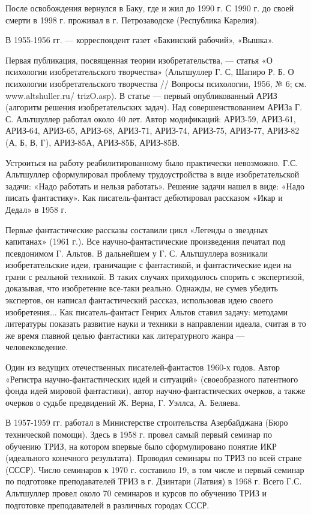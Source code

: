 После освобождения вернулся в Баку, где и  жил до 1990 г. С 1990 г. до
своей  смерти  в  1998  г. проживал  в  г.  Петрозаводске  (Республика
Карелия).

В 1955-1956 гг. — корреспондент газет «Бакинский рабочий», «Вышка».

Первая публикация,  посвященная теории  изобретательства, —  статья «О
психологии изобретательского  творчества» (Альтшуллер Г. С,  Шапиро Р.
Б. О  психологии изобретательского  творчества //  Вопросы психологии,
1956,  №  6; см.  www.altshuller.ru/  trizO.asp).  В статье  —  первый
опубликованный  АРИЗ (алгоритм  решения  изобретательских задач).  Над
совершенствованием АРИЗа Г. С. Альтшуллер  работал около 40 лет. Автор
модификаций:  АРИЗ-59, АРИЗ-61,  АРИЗ-64,  АРИЗ-65, АРИЗ-68,  АРИЗ-71,
АРИЗ-74, АРИЗ-75, АРИЗ-77,  АРИЗ-82 (А, Б, В,  Г), АРИЗ-85А, АРИЗ-85Б,
АРИЗ-85В.

Устроиться на  работу реабилитированному было  практически невозможно.
Г.С.   Альтшуллер  сформулировал   проблему  трудоустройства   в  виде
изобретательской задачи:  «Надо работать  и нельзя  работать». Решение
задачи нашел  в виде:  «Надо писать фантастику».  Как писатель-фантаст
дебютировал рассказом «Икар и Дедал» в 1958 г.

Первые  фантастические рассказы  составили  цикл  «Легенды о  звездных
капитанах» (1961  г.). Все научно-фантастические  произведения печатал
под псевдонимом Г. Альтов. В  дальнейшем у Г. С. Альтшуллера возникали
изобретательские идеи, граничащие с фантастикой, и фантастические идеи
на грани  с реальной техникой.  В таких случаях приходилось  спорить с
экспертизой,  доказывая, что  изобретение  все-таки реально.  Однажды,
не  сумев  убедить  экспертов,   он  написал  фантастический  рассказ,
использовав  идею своего  изобретения...  Как писатель-фантаст  Генрих
Альтов ставил  задачу: методами  литературы показать развитие  науки и
техники  в направлении  идеала, считая  в  то же  время главной  целью
фантастики как литературного жанра — человековедение.

Один  из  ведущих   отечественных  писателей-фантастов  1960-х  годов.
Автор «Регистра научно-фантастических  идей и ситуаций» (своеобразного
патентного фонда идей мировой фантастики), автор научно-фантастических
очерков, а также очерков о судьбе  предвидений Ж. Верна, Г. Уэллса, А.
Беляева.

В  1957-1959 гг.  работал  в  Министерстве строительства  Азербайджана
(Бюро технической помощи). Здесь в 1958 г. провел самый первый семинар
по обучению ТРИЗ,  на котором впервые было  сформулировано понятие ИКР
(идеального конечного  результата). Проводил семинары по  ТРИЗ по всей
стране (СССР). Число  семинаров к 1970 г. составило 19,  в том числе и
первый  семинар  по  подготовке  преподавателей  ТРИЗ  в  г.  Дзинтари
(Латвия) в 1968  г. Всего Г.С. Альтшуллер провел около  70 семинаров и
курсов  по  обучению  ТРИЗ  и подготовке  преподавателей  в  различных
городах СССР.

